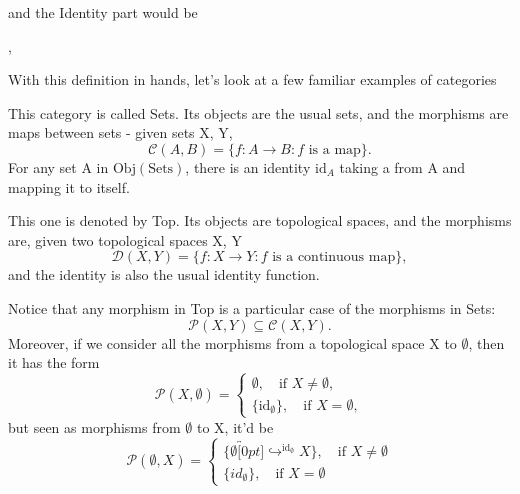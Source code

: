\documentclass[../category_theory.tex]{subfiles}
\begin{document}
and the Identity part would be
\begin{center}
	,
\end{center}
With this definition in hands, let's look at a few familiar examples of categories
\begin{example}
	This category is called Sets. Its objects are the usual sets, and the morphisms are maps between sets - given sets X, Y,
	\[
		\mathcal{C}(A, B)=\{f:A\rightarrow B: f \text{ is a map}\}.
	\]For any set A in \(\mathrm{Obj}(\text{Sets})\), there is an identity \(\mathrm{id}_{A}\) taking a from A and mapping it to itself.
\end{example}
\begin{example}
	This one is denoted by Top. Its objects are topological spaces, and the morphisms are, given two topological spaces X, Y
	\[
		\mathcal{D}(X, Y)=\{f:X\rightarrow Y: f \text{ is a continuous map}\},
	\]
	and the identity is also the usual identity function.
\end{example}
Notice that any morphism in Top is a particular case of the morphisms in Sets:
\[
	\mathcal{P}(X, Y)\subseteq \mathcal{C}(X, Y).
\]
Moreover, if we consider all the morphisms from a topological space X to \(\emptyset \), then it has the form
\[
	\mathcal{P}(X, \emptyset ) = \left\{\begin{array}{ll}
		\emptyset ,\quad \text{if }X \neq\emptyset, \\
		\{\mathrm{id}_{\emptyset}\},\quad \text{if }X=\emptyset,
	\end{array}\right.
\]
but seen as morphisms from \(\emptyset \) to X, it'd be
\[
	\mathcal{P}(\emptyset , X)  = \left\{\begin{array}{ll}
		\{\emptyset \overbracket[0pt]{\hookrightarrow}^{\mathrm{id}_{\emptyset }} X\},\quad \text{if }X\neq \emptyset \\
		\{id_{\emptyset }\}, \quad \text{if } X = \emptyset
	\end{array}\right.
\]
\end{document}
